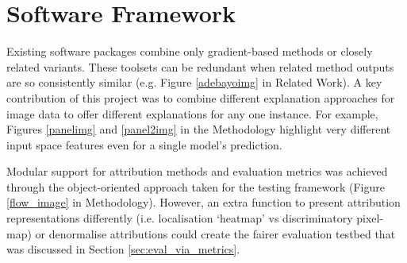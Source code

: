 \documentclass[main]{subfiles}
\begin{document}
\section{Software Framework}

Existing software packages combine only gradient-based methods or closely related variants. These toolsets can be redundant when related method outputs are so consistently similar (e.g. Figure \ref{adebayoimg} in Related Work). A key contribution of this project was to combine different explanation approaches for image data to offer different explanations for any one instance. For example, Figures \ref{panelimg} and \ref{panel2img} in the Methodology highlight very different input space features even for a single model's prediction.

Modular support for attribution methods and evaluation metrics was achieved through the object-oriented approach taken for the testing framework (Figure \ref{flow_image} in Methodology). However, an extra function to present attribution representations differently (i.e. localisation `heatmap' vs discriminatory pixel-map) or denormalise attributions could create the fairer evaluation testbed that was discussed in Section \ref{sec:eval_via_metrics}.
\end{document}
